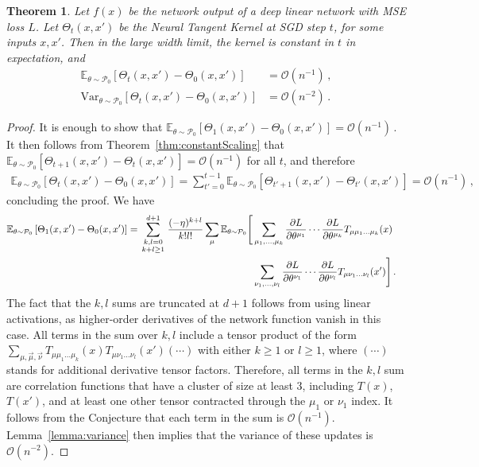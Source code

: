 \documentclass[english]{article}
\newtheorem{thm}{Theorem}
\newcommand{\dho}{\partial}
\newcommand{\cO}{\ensuremath{\mathcal{O}}}
\newcommand{\cP}{\ensuremath{\mathcal{P}}}
\newcommand{\lexpp}[1]{\mathbb{E}_{#1}\left[}
\newcommand{\rexp}{\right]}
\begin{document}
\begin{thm}\label{thm:constNTK}
  Let $f(x)$ be the network output of a deep linear network with MSE loss $L$.
  Let $\Theta_t(x,x')$ be the Neural Tangent Kernel at SGD step $t$, for some inputs $x,x'$.
  Then in the large width limit, the kernel is constant in $t$ in expectation, and
  \begin{align}
    \lexpp{\theta\sim\cP_0} \Theta_t(x,x') - \Theta_0(x,x') \rexp &= \cO(n^{-1})\,,\\
    \mathrm{Var}_{\theta\sim\cP_0} \left[ \Theta_t(x,x') - \Theta_0(x,x') \right] &= \cO(n^{-2}) \,.
  \end{align}
\end{thm}
\begin{proof}
  It is enough to show that
  $
    \lexpp{\theta\sim\cP_0} \Theta_1(x,x') - \Theta_0(x,x') \rexp = \cO(n^{-1}) \,.
  $
  It then follows from Theorem~\ref{thm:constantScaling} that $\lexpp{\theta\sim\cP_0} \Theta_{t+1}(x,x') - \Theta_t(x,x') \rexp = \cO(n^{-1})$ for all $t$, and therefore
  \begin{align}
    \lexpp{\theta\sim\cP_0} \Theta_t(x,x') - \Theta_0(x,x') \rexp =
    \sum_{t'=0}^{t-1} \lexpp{\theta\sim\cP_0} \Theta_{t'+1}(x,x') - \Theta_{t'}(x,x') \rexp = \cO(n^{-1}) \,,
  \end{align}
  concluding the proof.
  We have
  \begin{align}
    \lexpp{\theta\sim\cP_0} \Theta_1(x,x') - \Theta_0(x,x') \rexp
    = \sum_{\begin{smallmatrix}k,l=0 \\ k+l \ge 1\end{smallmatrix}}^{d+1} \frac{(-\eta)^{k+l}}{k!l!}
    \sum_\mu \mathbb{E}_{\theta\sim\cP_0}\Bigg[
      &\sum_{\mu_1,\dots,\mu_k} \frac{\dho L}{\dho \theta^{\mu_1}} \cdots \frac{\dho L}{\dho \theta^{\mu_k}}
      T_{\mu\mu_1\dots\mu_k}(x)
        \cr
      &\sum_{\nu_1,\dots,\nu_l} \frac{\dho L}{\dho \theta^{\nu_1}} \cdots \frac{\dho L}{\dho \theta^{\nu_l}}
      T_{\mu\nu_1\dots\nu_l}(x')
      \Bigg] \,.
  \end{align}
  The fact that the $k,l$ sums are truncated at $d+1$ follows from using linear activations, as higher-order derivatives of the network function vanish in this case.
  All terms in the sum over $k,l$ include a tensor product of the form $\sum_{\mu,\vec{\mu},\vec{\nu}} T_{\mu\mu_1\dots\mu_k}(x) T_{\mu\nu_1\dots\nu_l}(x') (\cdots)$ with either $k \ge 1$ or $l \ge 1$, where $(\cdots)$ stands for additional derivative tensor factors.
  Therefore, all terms in the $k,l$ sum are correlation functions that have a cluster of size at least 3, including $T(x)$, $T(x')$, and at least one other tensor contracted through the $\mu_1$ or $\nu_1$ index.
  It follows from the Conjecture that each term in the sum is $\cO(n^{-1})$.
  Lemma~\ref{lemma:variance} then implies that the variance of these updates is $\cO(n^{-2})$.
\end{proof}
\end{document}
